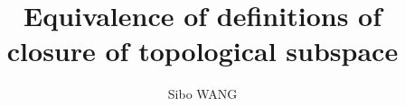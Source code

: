 \documentclass[12pt]{article}
\numberwithin{equation}{section}
\theoremstyle{plain} %
\theoremstyle{definition}
\theoremstyle{remark}
\begin{document}
\title{Equivalence of definitions of closure of topological subspace}


\author{Sibo WANG}







\date{}



\maketitle





\end{document}
